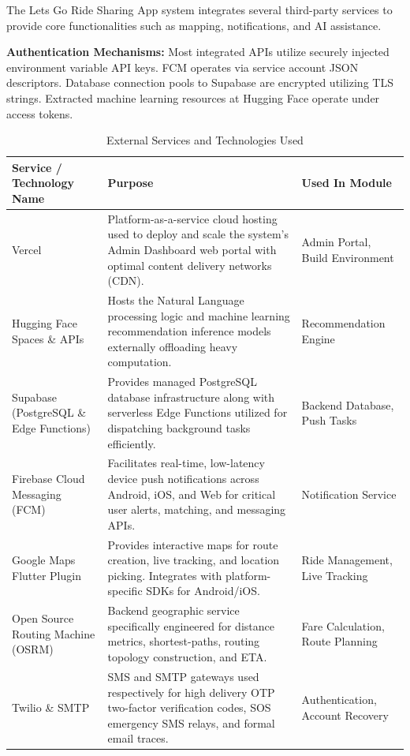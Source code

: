 The Lets Go Ride Sharing App system integrates several third-party services to provide core functionalities such as mapping, notifications, and AI assistance.

\textbf{Authentication Mechanisms:} Most integrated APIs utilize securely injected environment variable API keys. FCM operates via service account JSON descriptors. Database connection pools to Supabase are encrypted utilizing TLS strings. Extracted machine learning resources at Hugging Face operate under access tokens.

\begin{table}[H]
\centering
\caption{External Services and Technologies Used}
\begin{tabularx}{\textwidth}{|p{3.5cm}|X|p{4cm}|}
\hline
\textbf{Service / Technology Name} & \textbf{Purpose} & \textbf{Used In Module} \\
\hline
Vercel & Platform-as-a-service cloud hosting used to deploy and scale the system's Admin Dashboard web portal with optimal content delivery networks (CDN). & Admin Portal, Build Environment \\
\hline
Hugging Face Spaces \& APIs & Hosts the Natural Language processing logic and machine learning recommendation inference models externally offloading heavy computation. & Recommendation Engine \\
\hline
Supabase (PostgreSQL \& Edge Functions) & Provides managed PostgreSQL database infrastructure along with serverless Edge Functions utilized for dispatching background tasks efficiently. & Backend Database, Push Tasks \\
\hline
Firebase Cloud Messaging (FCM) & Facilitates real-time, low-latency device push notifications across Android, iOS, and Web for critical user alerts, matching, and messaging APIs. & Notification Service \\
\hline
Google Maps Flutter Plugin & Provides interactive maps for route creation, live tracking, and location picking. Integrates with platform-specific SDKs for Android/iOS. & Ride Management, Live Tracking \\
\hline
Open Source Routing Machine (OSRM) & Backend geographic service specifically engineered for distance metrics, shortest-paths, routing topology construction, and ETA. & Fare Calculation, Route Planning \\
\hline
Twilio \& SMTP & SMS and SMTP gateways used respectively for high delivery OTP two-factor verification codes, SOS emergency SMS relays, and formal email traces. & Authentication, Account Recovery \\
\hline
\end{tabularx}
\end{table}

